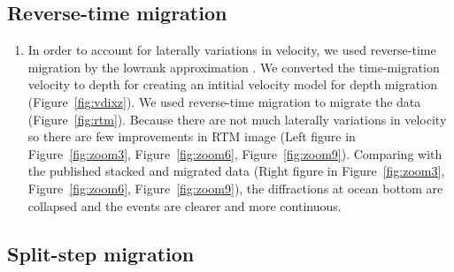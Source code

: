 \begin{comment}
\subsection{Kirchhoff post-stack time migration}

\begin{enumerate}

\item We used Kirchhoff post-stack time migration to migrate the data (Figure~\ref{fig:kmig}).

\plot{kmig}{width=0.8\textwidth}{Kirchhoff post-stack time migration.} 

\end{enumerate}
\end{comment}

\subsection{Reverse-time migration}

\begin{enumerate}

\item In order to account for laterally variations in velocity, we used reverse-time migration by the lowrank approximation \cite[]{lowrank}. We converted the time-migration velocity to depth for creating an intitial velocity model for depth migration (Figure~\ref{fig:vdixz}). We used reverse-time migration to migrate the data (Figure~\ref{fig:rtm}). Because there are not much laterally variations in velocity so there are few improvements in RTM image (Left figure in Figure~\ref{fig:zoom3}, Figure~\ref{fig:zoom6}, Figure~\ref{fig:zoom9}). Comparing with the published stacked and migrated data (Right figure in Figure~\ref{fig:zoom3}, Figure~\ref{fig:zoom6}, Figure~\ref{fig:zoom9}), the diffractions at ocean bottom are collapsed and the events are clearer and more continuous.          


\end{enumerate}\clearpage

\subsection{Split-step migration}

